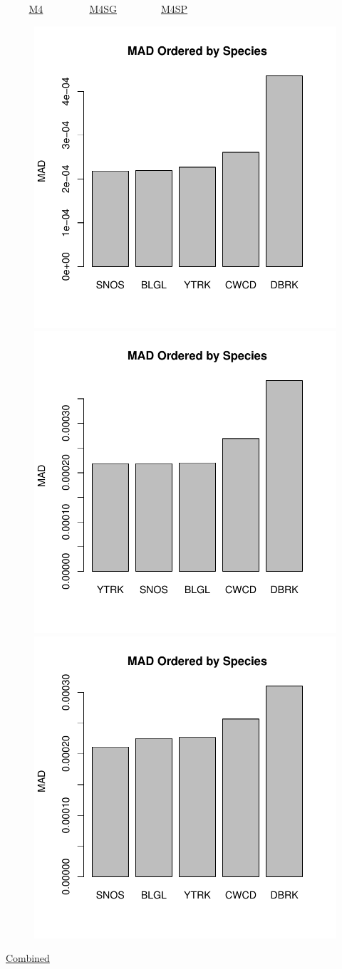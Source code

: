 \documentclass[ xcolor = pdftex, dvipsnames, table ]{beamer}
\begin{document}
%
\begin{frame}{$~~~~~~~~~$ \href{https://github.com/gasduster99/sppComp/tree/master/sscRuns/25319781982M4}{M4} $~~~~~~~~~~~~~~~~~~$ \href{https://github.com/gasduster99/sppComp/tree/master/sscRuns/25319781982M4IGSG}{M4SG} $~~~~~~~~~~~~~~~~~$ \href{https://github.com/gasduster99/sppComp/tree/master/sscRuns/25319781982M4IGSP}{M4SP} }
        \begin{figure}[ht!]
        \centering
        \hspace*{-1cm}
        \includegraphics[width=.4\textwidth]{../sscRuns/25319781982M4/sppTailMad68.pdf}
        \includegraphics[width=.4\textwidth]{../sscRuns/25319781982M4IGSG/sppTailMad68.pdf}
        \includegraphics[width=.4\textwidth]{../sscRuns/25319781982M4IGSP/sppTailMad68.pdf}
        \end{figure}
	\vspace{-1cm}
	\begin{center}
	\Large
	\href{https://github.com/gasduster99/sppComp/tree/master/try1/postSSC/25319781982M4IGSPSG}{Combined}
	\end{center}
\end{frame}
\end{document}

